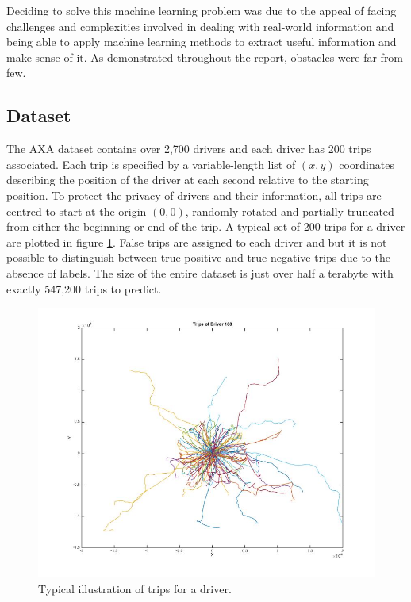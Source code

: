 \documentclass[a4paper, 11pt, twocolumn]{report}
\begin{document}
Deciding to solve this machine learning problem was due to the appeal of facing challenges and complexities involved in dealing with real-world information and being able to apply machine learning methods to extract useful information and make sense of it.
As demonstrated throughout the report, obstacles were far from few.

\subsection{Dataset}

The AXA dataset contains over 2,700 drivers and each driver has 200 trips associated.
Each trip is specified by a variable-length list of $(x,y)$ coordinates describing the position of the driver at each second relative to the starting position.
To protect the privacy of drivers and their information, all trips are centred to start at the origin $(0,0)$, randomly rotated and partially truncated from either the beginning or end of the trip.
A typical set of 200 trips for a driver are plotted in figure \ref{fig:tripsgraph}.
False trips are assigned to each driver and but it is not possible to distinguish between true positive and true negative trips due to the absence of labels.
The size of the entire dataset is just over half a terabyte with exactly 547,200 trips to predict.

\begin{figure}[h]
    \center
    \includegraphics[width=\linewidth]{img/sample_driver_vis}
    \caption{Typical illustration of trips for a driver.}
    \label{fig:tripsgraph}
\end{figure}
\end{document}
